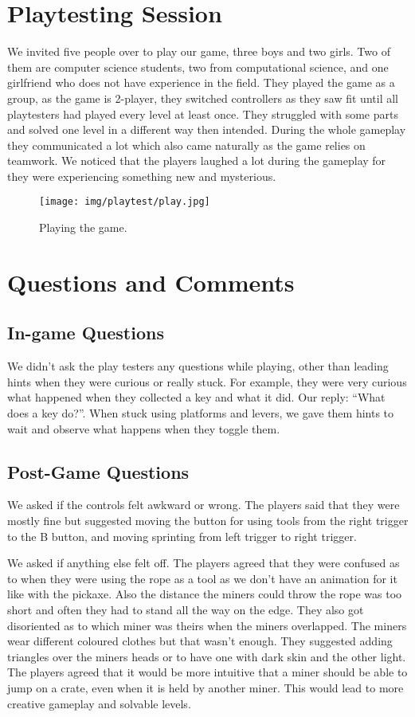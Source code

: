 \section{Playtesting Session}

We invited five people over to play our game, three boys and two girls. Two of them are computer science students, two from computational science, and one girlfriend who does not have experience in the field. They played the game as a group, as the game is 2-player, they switched controllers as they saw fit until all playtesters had played every level at least once. They struggled with some parts and solved one level in a different way then intended. During the whole gameplay they communicated a lot which also came naturally as the game relies on teamwork. We noticed that the players laughed a lot during the gameplay for they were experiencing something new and mysterious.


\begin{figure}[h!]
    \centering
    \texttt{[image: img/playtest/play.jpg]}
    \caption{Playing the game.}
    \label{fig:my_label}
\end{figure}
\section{Questions and Comments}

\subsection{In-game Questions}
We didn't ask the play testers any questions while playing, other than leading hints when they were curious or really stuck. For example, they were very curious what happened when they collected a key and what it did. Our reply: \enquote{What does a key do?}. When stuck using platforms and levers, we gave them hints to wait and observe what happens when they toggle them.

\subsection{Post-Game Questions}
We asked if the controls felt awkward or wrong. The players said that they were mostly fine but suggested moving the button for using tools from the right trigger to the B button, and moving sprinting from left trigger to right trigger.

We asked if anything else felt off. The players agreed that they were confused as to when they were using the rope as a tool as we don't have an animation for it like with the pickaxe. Also the distance the miners could throw the rope was too short and often they had to stand all the way on the edge. They also got disoriented as to which miner was theirs when the miners overlapped. The miners wear different coloured clothes but that wasn't enough. They suggested adding triangles over the miners heads or to have one with dark skin and the other light. 
The players agreed that it would be more intuitive that a miner should be able to jump on a crate, even when it is held by another miner. This would lead to more creative gameplay and solvable levels.

